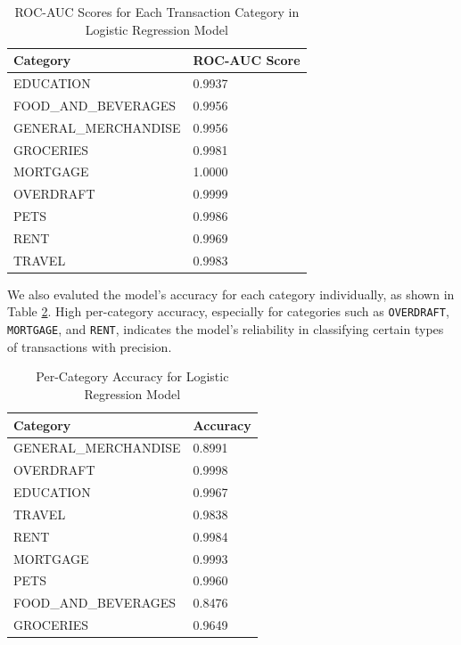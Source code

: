 \documentclass[12pt,letterpaper]{article}
\begin{document}
\begin{table}[h]
    \centering
    \begin{tabular}{ll}
        \hline
        \textbf{Category} & \textbf{ROC-AUC Score} \\
        \hline
        EDUCATION & 0.9937 \\
        FOOD\_AND\_BEVERAGES & 0.9956 \\
        GENERAL\_MERCHANDISE & 0.9956 \\
        GROCERIES & 0.9981 \\
        MORTGAGE & 1.0000 \\
        OVERDRAFT & 0.9999 \\
        PETS & 0.9986 \\
        RENT & 0.9969 \\
        TRAVEL & 0.9983 \\
        \hline
    \end{tabular}
    \caption{ROC-AUC Scores for Each Transaction Category in Logistic Regression Model}
    \label{table:roc_auc_scores_logreg}
\end{table}

We also evaluted the model’s accuracy for each category individually, as shown in Table \ref{table:category_accuracy_logreg}. High per-category accuracy, especially for categories such as \texttt{OVERDRAFT}, \texttt{MORTGAGE}, and \texttt{RENT}, indicates the model's reliability in classifying certain types of transactions with precision.

\begin{table}[h]
    \centering
    \begin{tabular}{ll}
        \hline
        \textbf{Category} & \textbf{Accuracy} \\
        \hline
        GENERAL\_MERCHANDISE & 0.8991 \\
        OVERDRAFT & 0.9998 \\
        EDUCATION & 0.9967 \\
        TRAVEL & 0.9838 \\
        RENT & 0.9984 \\
        MORTGAGE & 0.9993 \\
        PETS & 0.9960 \\
        FOOD\_AND\_BEVERAGES & 0.8476 \\
        GROCERIES & 0.9649 \\
        \hline
    \end{tabular}
    \caption{Per-Category Accuracy for Logistic Regression Model}
    \label{table:category_accuracy_logreg}
\end{table}
\end{document}
